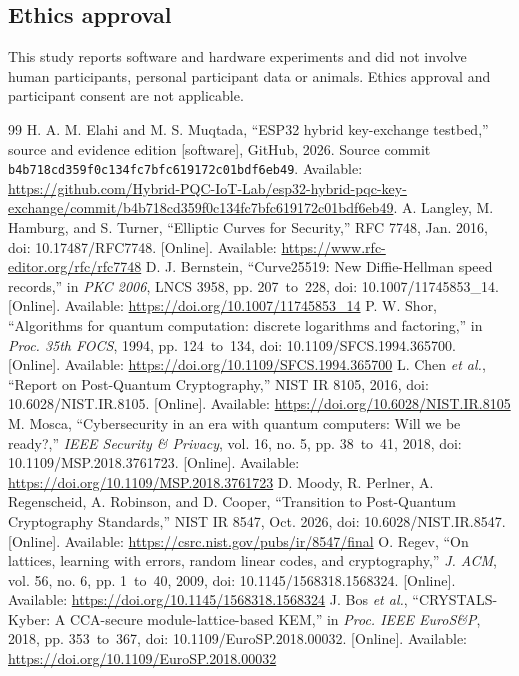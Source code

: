 \documentclass[pdflatex,sn-mathphys-num]{sn-jnl}
\newcommand{\ArtifactCommit}{b4b718cd359f0c134fc7bfc619172c01bdf6eb49}%
\newcommand{\ArtifactRelease}{https://github.com/Hybrid-PQC-IoT-Lab/esp32-hybrid-pqc-key-exchange/commit/b4b718cd359f0c134fc7bfc619172c01bdf6eb49}%
\begin{document}
\subsection*{Ethics approval}
This study reports software and hardware experiments and did not involve human participants, personal participant data or animals. Ethics approval and participant consent are not applicable.

\setlength{\bibsep}{0.4em}
\begin{thebibliography}{99}
H. A. M. Elahi and M. S. Muqtada, ``ESP32 hybrid key-exchange testbed,'' source and evidence edition [software], GitHub, 2026. Source commit \nolinkurl{\ArtifactCommit}. Available: \url{\ArtifactRelease}.
 A. Langley, M. Hamburg, and S. Turner, ``Elliptic Curves for Security,'' RFC 7748, Jan. 2016, doi: 10.17487/RFC7748. [Online]. Available: \url{https://www.rfc-editor.org/rfc/rfc7748}
 D. J. Bernstein, ``Curve25519: New Diffie-Hellman speed records,'' in \textit{PKC 2006}, LNCS 3958, pp. 207~to~228, doi: 10.1007/11745853\_14. [Online]. Available: \url{https://doi.org/10.1007/11745853_14}
 P. W. Shor, ``Algorithms for quantum computation: discrete logarithms and factoring,'' in \textit{Proc. 35th FOCS}, 1994, pp. 124~to~134, doi: 10.1109/SFCS.1994.365700. [Online]. Available: \url{https://doi.org/10.1109/SFCS.1994.365700}
 L. Chen \textit{et al.}, ``Report on Post-Quantum Cryptography,'' NIST IR 8105, 2016, doi: 10.6028/NIST.IR.8105. [Online]. Available: \url{https://doi.org/10.6028/NIST.IR.8105}
 M. Mosca, ``Cybersecurity in an era with quantum computers: Will we be ready?,'' \textit{IEEE Security \& Privacy}, vol. 16, no. 5, pp. 38~to~41, 2018, doi: 10.1109/MSP.2018.3761723. [Online]. Available: \url{https://doi.org/10.1109/MSP.2018.3761723}
 D. Moody, R. Perlner, A. Regenscheid, A. Robinson, and D. Cooper, ``Transition to Post-Quantum Cryptography Standards,'' NIST IR 8547, Oct. 2026, doi: 10.6028/NIST.IR.8547. [Online]. Available: \url{https://csrc.nist.gov/pubs/ir/8547/final}
 O. Regev, ``On lattices, learning with errors, random linear codes, and cryptography,'' \textit{J. ACM}, vol. 56, no. 6, pp. 1~to~40, 2009, doi: 10.1145/1568318.1568324. [Online]. Available: \url{https://doi.org/10.1145/1568318.1568324}
 J. Bos \textit{et al.}, ``CRYSTALS-Kyber: A CCA-secure module-lattice-based KEM,'' in \textit{Proc. IEEE EuroS\&P}, 2018, pp. 353~to~367, doi: 10.1109/EuroSP.2018.00032. [Online]. Available: \url{https://doi.org/10.1109/EuroSP.2018.00032}

\end{thebibliography}
\end{document}
